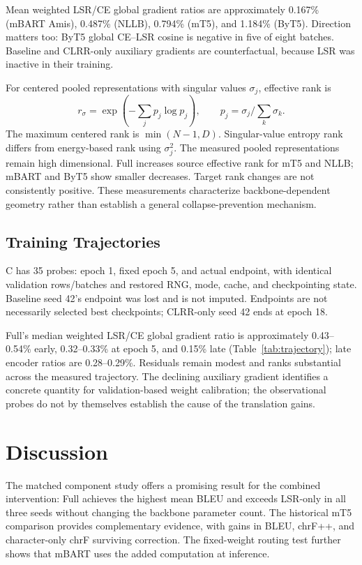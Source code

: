 \documentclass[11pt]{article}
\begin{document}
Mean weighted LSR/CE global gradient ratios are approximately 0.167\% (mBART Amis), 0.487\% (NLLB), 0.794\% (mT5), and 1.184\% (ByT5). Direction matters too: ByT5 global CE--LSR cosine is negative in five of eight batches. Baseline and CLRR-only auxiliary gradients are counterfactual, because LSR was inactive in their training.

For centered pooled representations with singular values $\sigma_j$, effective rank is
\begin{equation}
r_\sigma=\exp(-\sum_j p_j\log p_j),\qquad p_j=\sigma_j/\sum_k\sigma_k.
\end{equation}
The maximum centered rank is $\min(N-1,D)$. Singular-value entropy rank differs from energy-based rank using $\sigma_j^2$. The measured pooled representations remain high dimensional. Full increases source effective rank for mT5 and NLLB; mBART and ByT5 show smaller decreases. Target rank changes are not consistently positive. These measurements characterize backbone-dependent geometry rather than establish a general collapse-prevention mechanism.

\subsection{Training Trajectories}
C has 35 probes: epoch 1, fixed epoch 5, and actual endpoint, with identical validation rows/batches and restored RNG, mode, cache, and checkpointing state. Baseline seed 42's endpoint was lost and is not imputed. Endpoints are not necessarily selected best checkpoints; CLRR-only seed 42 ends at epoch 18.

Full's median weighted LSR/CE global gradient ratio is approximately 0.43--0.54\% early, 0.32--0.33\% at epoch 5, and 0.15\% late (Table~\ref{tab:trajectory}); late encoder ratios are 0.28--0.29\%. Residuals remain modest and ranks substantial across the measured trajectory. The declining auxiliary gradient identifies a concrete quantity for validation-based weight calibration; the observational probes do not by themselves establish the cause of the translation gains.

\section{Discussion}
The matched component study offers a promising result for the combined intervention: Full achieves the highest mean BLEU and exceeds LSR-only in all three seeds without changing the backbone parameter count. The historical mT5 comparison provides complementary evidence, with gains in BLEU, chrF++, and character-only chrF surviving correction. The fixed-weight routing test further shows that mBART uses the added computation at inference.
\end{document}
